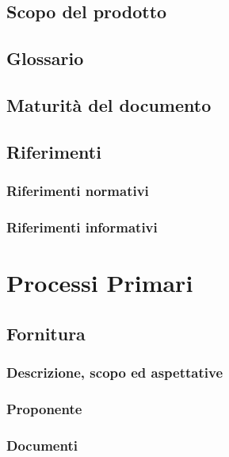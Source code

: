 \documentclass[a4paper, 11pt]{article}
\begin{document}
    \subsection{Scopo del prodotto}

    \subsection{Glossario}

    \subsection{Maturità del documento}

    \subsection{Riferimenti}

        \subsubsection{Riferimenti normativi}

        \subsubsection{Riferimenti informativi}

\pagebreak
\section{Processi Primari}

    \subsection{Fornitura}

        \subsubsection{Descrizione, scopo ed aspettative}

        \subsubsection{Proponente}

        \subsubsection{Documenti}
\end{document}
